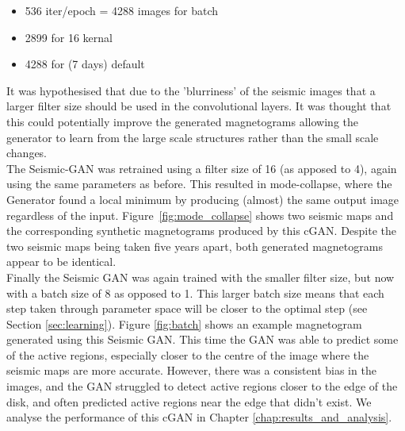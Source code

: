 \documentclass[11pt,a4paper,onecolumn]{report}
\begin{document}
\begin{itemize}
  \item 536 iter/epoch = 4288 images for batch
  \item 2899 for 16 kernal
  \item 4288 for (7 days) default
\end{itemize}

It was hypothesised that due to the 'blurriness' of the seismic images that a
larger filter size should be used in the convolutional layers. It was thought
that this could potentially improve the generated magnetograms allowing the
generator to learn from the large scale structures rather than the small scale
changes.\\

The Seismic-GAN was retrained using a filter size of 16 (as apposed to 4), again
using the same parameters as before. This resulted in mode-collapse, where
the Generator found a local minimum by producing (almost) the same output
image regardless of the input. Figure~\ref{fig:mode_collapse} shows two seismic
maps and the corresponding synthetic magnetograms produced by this cGAN. Despite
the two seismic maps being taken five years apart, both generated magnetograms
appear to be identical.\\

Finally the Seismic GAN was again trained with the smaller filter size, but now
with a batch size of 8 as opposed to 1. This larger batch size means that each
step taken through parameter space will be closer to the optimal step (see
Section \ref{sec:learning}). Figure \ref{fig:batch} shows an example magnetogram
generated using this Seismic GAN. This time the GAN was able to predict some of
the active regions, especially closer to the centre of the image where the
seismic maps are more accurate. However, there was a consistent bias in the
images, and the GAN struggled to detect active regions closer to the edge of the
disk, and often predicted active regions near the edge that didn't exist. We
analyse the performance of this cGAN in Chapter \ref{chap:results_and_analysis}.
\end{document}
